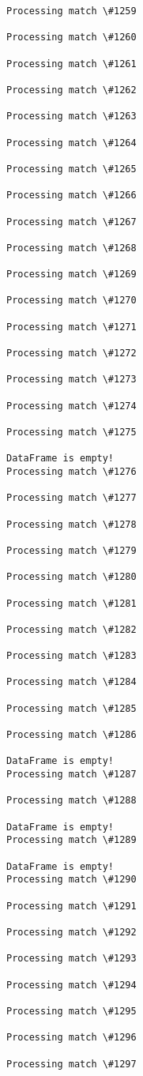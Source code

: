 \documentclass[11pt]{article}
\begin{document}
\begin{Verbatim}[commandchars=\\\{\}]
Processing match \#1259

Processing match \#1260

Processing match \#1261

Processing match \#1262

Processing match \#1263

Processing match \#1264

Processing match \#1265

Processing match \#1266

Processing match \#1267

Processing match \#1268

Processing match \#1269

Processing match \#1270

Processing match \#1271

Processing match \#1272

Processing match \#1273

Processing match \#1274

Processing match \#1275

DataFrame is empty!
Processing match \#1276

Processing match \#1277

Processing match \#1278

Processing match \#1279

Processing match \#1280

Processing match \#1281

Processing match \#1282

Processing match \#1283

Processing match \#1284

Processing match \#1285

Processing match \#1286

DataFrame is empty!
Processing match \#1287

Processing match \#1288

DataFrame is empty!
Processing match \#1289

DataFrame is empty!
Processing match \#1290

Processing match \#1291

Processing match \#1292

Processing match \#1293

Processing match \#1294

Processing match \#1295

Processing match \#1296

Processing match \#1297


\end{Verbatim}
\end{document}
